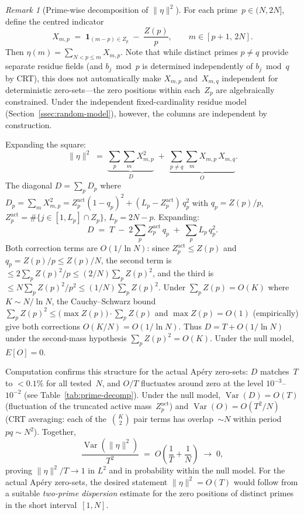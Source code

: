 \documentclass[11pt]{article}
\theoremstyle{definition}
\theoremstyle{remark}
\newtheorem{remark}[theorem]{Remark}
\begin{document}
\begin{remark}[Prime-wise decomposition of $\|\eta\|^2$]
\label{rem:prime-decomposition}
For each prime~$p \in (N,2N]$, define
the centred indicator
\[
X_{m,p}
\;=\;
\mathbf{1}_{(m-p) \in Z_p}
\;-\;
\frac{Z(p)}{p},
\qquad
m \in [p{+}1,\,2N].
\]
Then $\eta(m) = \sum_{N < p \le m} X_{m,p}$.
Note that while distinct primes
$p \ne q$ provide separate residue fields
(and $b_j \bmod p$ is determined
independently of $b_j \bmod q$ by CRT),
this does not automatically make
$X_{m,p}$ and~$X_{m,q}$ independent
for deterministic zero-sets---the
zero positions within each~$Z_p$ are
algebraically constrained.
Under the independent
fixed-cardinality residue model
(Section~\ref{ssec:random-model}),
however, the columns are independent
by construction.

Expanding the square:
\begin{equation}\label{eq:eta-prime-decomp}
\|\eta\|^2
\;=\;
\underbrace{\sum_p \sum_m X_{m,p}^2}_{D}
\;+\;
\underbrace{\sum_{p \ne q}\sum_m X_{m,p}\,X_{m,q}}_{O}.
\end{equation}
The diagonal $D = \sum_p D_p$ where
$D_p = \sum_m X_{m,p}^2 = Z_p^{\mathrm{act}}(1{-}q_p)^2
+ (L_p - Z_p^{\mathrm{act}})\,q_p^2$
with $q_p = Z(p)/p$,
$Z_p^{\mathrm{act}} = \#\{j \in [1,L_p] \cap Z_p\}$,
$L_p = 2N - p$.
Expanding:
\begin{equation}\label{eq:D-identity}
D \;=\; T
\;-\; 2\sum_p Z_p^{\mathrm{act}}\,q_p
\;+\; \sum_p L_p\,q_p^2.
\end{equation}
Both correction terms are $O(1/\ln N)$:
since $Z_p^{\mathrm{act}} \le Z(p)$ and
$q_p = Z(p)/p \le Z(p)/N$, the second
term is $\le 2\sum_p Z(p)^2/p
\le (2/N)\sum_p Z(p)^2$, and the
third is $\le N\sum_p Z(p)^2/p^2
\le (1/N)\sum_p Z(p)^2$.
Under $\sum_p Z(p) = O(K)$
where $K \sim N/\ln N$,
the Cauchy--Schwarz bound
$\sum_p Z(p)^2 \le
\bigl(\max Z(p)\bigr)\cdot\sum_p Z(p)$
and $\max Z(p) = O(1)$ (empirically)
give both corrections $O(K/N) = O(1/\ln N)$.
Thus $D = T + O(1/\ln N)$ under the
second-mass hypothesis $\sum_p Z(p)^2 = O(K)$.
Under the null model, $E[O] = 0$.

Computation confirms this structure
for the actual Ap\'ery zero-sets:
$D$ matches~$T$ to $< 0.1\%$ for all
tested~$N$, and $O/T$ fluctuates
around zero at the level $10^{-3}$--$10^{-2}$
(see Table~\ref{tab:prime-decomp}).
Under the null model,
$\operatorname{Var}(D) = O(T)$
(fluctuation of the truncated
active mass~$Z_p^{\mathrm{act}}$)
and
$\operatorname{Var}(O) = O(T^2/N)$
(CRT averaging: each of
the~$\binom{K}{2}$ pair terms has
overlap~$\sim N$ within
period~$pq \sim N^2$).
Together,
\[
\frac{\operatorname{Var}(\|\eta\|^2)}{T^2}
\;=\; O\!\left(\frac{1}{T} + \frac{1}{N}\right)
\;\to\; 0,
\]
proving $\|\eta\|^2/T \to 1$ in
$L^2$ and in probability within
the null model.
For the actual Ap\'ery zero-sets, the desired statement
$\|\eta\|^2 = O(T)$ would follow from a suitable
\emph{two-prime dispersion} estimate for the zero positions
of distinct primes in the short interval~$[1,N]$.


\end{remark}
\end{document}
